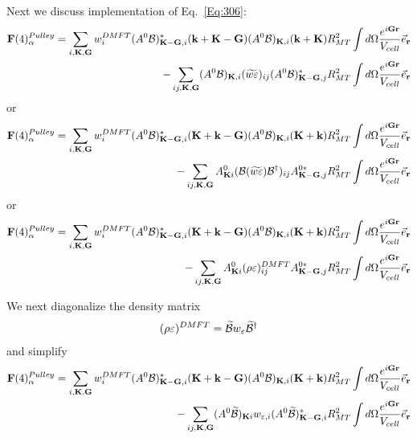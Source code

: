 \documentclass[aps,prb,floatfix,epsfig,singlecolumn,showpacs,preprintnumbers]{revtex4}
\newcommand{\vF}{{\mathbf{F}}}
\renewcommand{\vr}{{\mathbf{r}}}
\newcommand{\vk}{{\mathbf{k}}}
\newcommand{\vK}{{\mathbf{K}}}
\newcommand{\vG}{{\mathbf{G}}}
\newcommand{\cB}{{\cal B}}
\begin{document}
Next we discuss implementation of Eq.~\ref{Eq:306}:
\begin{eqnarray}
\vF(4)^{Pulley}_\alpha = 
\sum_{i,\vK,\vG} w_i^{DMFT} (A^0\cB)_{\vK-\vG,i}^* (\vk+\vK-\vG)  (A^0\cB)_{\vK,i}  (\vk+\vK) R_{MT}^2 \int d\Omega \frac{e^{i\vG\vr}}{V_{cell}}\vec{e}_\vr \\
-\sum_{ij,\vK,\vG} (A^0\cB)_{\vK,i} (\widetilde{w\varepsilon})_{ij} (A^0\cB)_{\vK-\vG,j}^* R_{MT}^2 \int d\Omega \frac{e^{i\vG\vr}}{V_{cell}}\vec{e}_\vr
\label{eq:Pule4n}
\end{eqnarray}
or
\begin{eqnarray}
\vF(4)^{Pulley}_\alpha = 
\sum_{i,\vK,\vG} w_i^{DMFT} (A^0\cB)_{\vK-\vG,i}^* (\vK+\vk-\vG)  (A^0\cB)_{\vK,i}  (\vK+\vk) R_{MT}^2 \int d\Omega \frac{e^{i\vG\vr}}{V_{cell}}\vec{e}_\vr \\
-\sum_{ij,\vK,\vG} A^0_{\vK i}  
(\cB (\widetilde{w\varepsilon}){\cB^\dagger})_{i j} 
  A^{0*}_{\vK-\vG,j}R_{MT}^2 \int d\Omega \frac{e^{i\vG\vr}}{V_{cell}}\vec{e}_\vr
\end{eqnarray}
or
\begin{eqnarray}
\vF(4)^{Pulley}_\alpha = 
\sum_{i,\vK,\vG} w_i^{DMFT} (A^0\cB)_{\vK-\vG,i}^* (\vK+\vk-\vG)  (A^0\cB)_{\vK,i}  (\vK+\vk) R_{MT}^2 \int d\Omega \frac{e^{i\vG\vr}}{V_{cell}} \vec{e}_\vr\\
-\sum_{ij,\vK,\vG} A^0_{\vK i}  (\rho\varepsilon)^{DMFT}_{i j} 
  A^{0*}_{\vK-\vG,j}R_{MT}^2 \int d\Omega \frac{e^{i\vG\vr}}{V_{cell}}\vec{e}_\vr
\end{eqnarray}

We next diagonalize the density matrix
\begin{eqnarray}
 (\rho\varepsilon)^{DMFT} = \widetilde{\cB} w_\varepsilon \widetilde{\cB}^\dagger
\end{eqnarray}
and simplify
\begin{eqnarray}
\vF(4)^{Pulley}_\alpha = 
\sum_{i,\vK,\vG} w_i^{DMFT} (A^0\cB)_{\vK-\vG,i}^* (\vK+\vk-\vG)  (A^0\cB)_{\vK,i}  (\vK+\vk) R_{MT}^2 \int d\Omega \frac{e^{i\vG\vr}}{V_{cell}}\vec{e}_\vr \\
-\sum_{ij,\vK,\vG} (A^0\widetilde{\cB})_{\vK i} w_{\varepsilon,i}
(A^{0}\widetilde{\cB})^*_{\vK-\vG,i}R_{MT}^2 \int d\Omega \frac{e^{i\vG\vr}}{V_{cell}}\vec{e}_\vr
\end{eqnarray}
\end{document}
